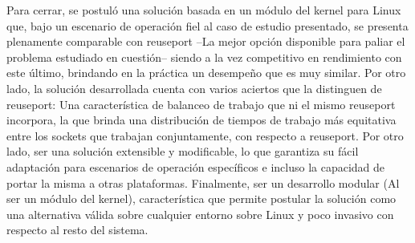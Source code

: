 \begin{conclusion}
 
Para cerrar, se postuló una solución basada en un módulo del kernel para Linux que, bajo un escenario de operación fiel al caso de estudio presentado, se presenta plenamente comparable con reuseport --La mejor opción disponible para paliar el problema estudiado en cuestión-- siendo a la vez competitivo en rendimiento con este último, brindando en la práctica un desempeño que es muy similar. Por otro lado, la solución desarrollada cuenta con varios aciertos que la distinguen de reuseport: Una característica de balanceo de trabajo que ni el mismo reuseport incorpora, la que brinda una distribución de tiempos de trabajo más equitativa entre los sockets que trabajan conjuntamente, con respecto a reuseport. Por otro lado, ser una solución extensible y modificable, lo que garantiza su fácil adaptación para escenarios de operación específicos e incluso la capacidad de portar la misma a otras plataformas. Finalmente, ser un desarrollo modular (Al ser un módulo del kernel), característica que permite postular la solución como una alternativa válida sobre cualquier entorno sobre Linux y poco invasivo con respecto al resto del sistema.

\end{conclusion}